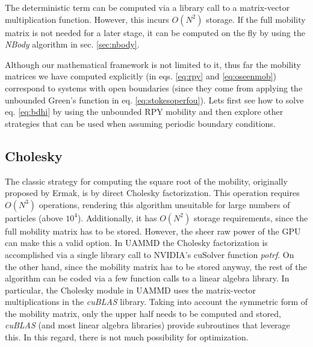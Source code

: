 \documentclass[ twoside,openright,titlepage,numbers=noenddot,%
headinclude,footinclude,cleardoublepage=empty,abstract=on,
BCOR=5mm,paper=a4,fontsize=11pt, dvipsnames
]{scrreprt}
\newcommand{\uammd}{\gls{UAMMD}\xspace}
\newcommand{\gpu}{\gls{GPU}\xspace}
\begin{document}
The deterministic term can be computed via a library call to a matrix-vector multiplication function. However, this incurs $O(N^2)$ storage. If the full mobility matrix is not needed for a later stage, it can be computed on the fly by using the \emph{NBody} algorithm in sec. \ref{sec:nbody}.

Although our mathematical framework is not limited to it, thus far the mobility matrices we have computed explicitly (in eqs. \eqref{eq:rpy} and \eqref{eq:oseenmob}) correspond to systems with open boundaries (since they come from applying the unbounded Green's function in eq. \eqref{eq:stokesoperfou}). Lets first see how to solve eq. \eqref{eq:bdhi} by using the unbounded \gls{RPY} mobility and then explore other strategies that can be used when assuming periodic boundary conditions.
\subsection{Cholesky}\label{sec:chol}
The classic strategy for computing the square root of the mobility, originally proposed by Ermak\cite{Ermak1978}, is by direct Cholesky factorization. This operation requires $O(N^3)$ operations, rendering this algorithm unsuitable for large numbers of particles (above $10^4$). Additionally, it has $O(N^2)$ storage requirements, since the full mobility matrix has to be stored.
However, the sheer raw power of the \gpu can make this a valid option. In \uammd the Cholesky factorization is accomplished via a single library call to NVIDIA's cuSolver function \emph{potrf}.
On the other hand, since the mobility matrix has to be stored anyway, the rest of the algorithm can be coded via a few function calls to a linear algebra library. In particular, the Cholesky module in \uammd uses the matrix-vector multiplications in the \emph{cuBLAS} library\cite{cublas}. Taking into account the symmetric form of the mobility matrix, only the upper half needs to be computed and stored, \emph{cuBLAS} (and most linear algebra libraries) provide subroutines that leverage this. In this regard, there is not much possibility for optimization.
\end{document}
